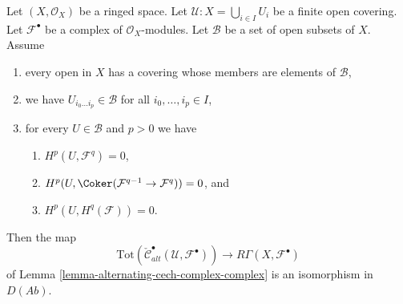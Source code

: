 \begin{lemma}
\label{lemma-alternating-cech-complex-complex-ss}
Let $(X, \mathcal{O}_X)$ be a ringed space. Let
$\mathcal{U} : X = \bigcup_{i \in I} U_i$ be a finite open covering. Let
$\mathcal{F}^\bullet$ be a complex of $\mathcal{O}_X$-modules.
Let $\mathcal{B}$ be a set of open subsets of $X$. Assume
\begin{enumerate}
\item every open in $X$ has a covering whose members are
elements of $\mathcal{B}$,
\item we have $U_{i_0\ldots i_p} \in \mathcal{B}$ for all
$i_0, \ldots, i_p \in I$,
\item for every $U \in \mathcal{B}$ and $p > 0$ we have
\begin{enumerate}
\item $H^p(U, \mathcal{F}^q) = 0$,
\item $H^p(U, \Coker(\mathcal{F}^{q - 1} \to \mathcal{F}^q)) = 0$, and
\item $H^p(U, H^q(\mathcal{F})) = 0$.
\end{enumerate}
\end{enumerate}
Then the map
$$
\text{Tot}(\check{\mathcal{C}}^\bullet_{alt}(\mathcal{U}, \mathcal{F}^\bullet))
\longrightarrow
R\Gamma(X, \mathcal{F}^\bullet)
$$
of Lemma \ref{lemma-alternating-cech-complex-complex}
is an isomorphism in $D(\textit{Ab})$.
\end{lemma}


